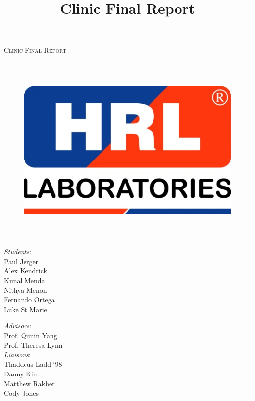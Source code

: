 \documentclass[pdftex,12pt,a4paper]{article}
\title{Clinic Final Report}
\newcommand{\HRule}{\rule{\linewidth}{0.5mm}}
\begin{document}
\begin{titlepage}

\vspace*{\fill}
\begin{center}

\textsc{\Large Clinic Final Report}\\[1.5cm]

\HRule \\[0.4cm]
\begin{figure}[h]
  \centering
    \includegraphics[scale=2.80]{HRL_logo.jpg}
\end{figure}

\HRule \\[1.5cm]



\begin{minipage}[t]{0.4\textwidth}
    \begin{flushleft}
        \large \textit{Students}:\vspace*{0.3cm} \\
        Paul Jerger \\
		Alex Kendrick\\
		Kunal Menda\\
		Nithya Menon\\
		Fernando Ortega\\
		Luke St Marie\\
    \end{flushleft}
\end{minipage}%
%
\begin{minipage}[t]{0.4\textwidth}
    \begin{flushright}
        \large \textit{Advisors}:\vspace*{0.3cm} \\
        Prof. Qimin Yang\\
		Prof. Theresa Lynn\\
        \vspace*{0.5cm}
        \large \textit{Liaisons}:\vspace*{0.3cm} \\
        Thaddeus Ladd `98\\
        Danny Kim\\
        Matthew Rakher\\
        Cody Jones
    \end{flushright}
\end{minipage}%


\end{center}
\end{titlepage}
\end{document}
